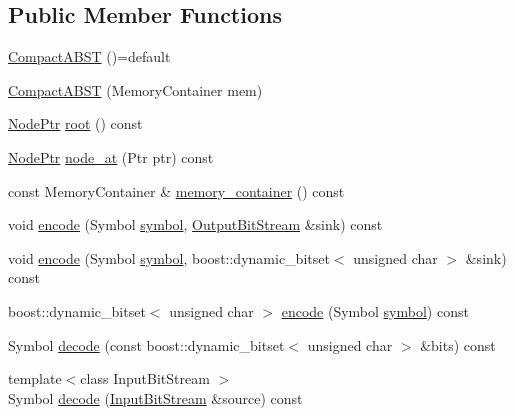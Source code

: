 \subsection*{Public Member Functions}
\begin{DoxyCompactItemize}
\item 
\mbox{\hyperlink{classirkit_1_1io_1_1CompactABST_a1798488f66866fcf6f4d7fd06f86f3e1}{Compact\+A\+B\+ST}} ()=default
\item 
\mbox{\hyperlink{classirkit_1_1io_1_1CompactABST_ae247cd36f3a912208312a6fd20a9deda}{Compact\+A\+B\+ST}} (Memory\+Container mem)
\item 
\mbox{\hyperlink{structirkit_1_1io_1_1CompactABST_1_1NodePtr}{Node\+Ptr}} \mbox{\hyperlink{classirkit_1_1io_1_1CompactABST_a08d1b23d44415a0505e8abf5c723a16a}{root}} () const
\item 
\mbox{\hyperlink{structirkit_1_1io_1_1CompactABST_1_1NodePtr}{Node\+Ptr}} \mbox{\hyperlink{classirkit_1_1io_1_1CompactABST_a6ef6afae469190875c8f49a37fa484e9}{node\+\_\+at}} (Ptr ptr) const
\item 
const Memory\+Container \& \mbox{\hyperlink{classirkit_1_1io_1_1CompactABST_a6c0944a0683df43e03f6faec67d3d719}{memory\+\_\+container}} () const
\item 
void \mbox{\hyperlink{classirkit_1_1io_1_1CompactABST_aa4d1008e712a1fb8e95baa924cc70e50}{encode}} (Symbol \mbox{\hyperlink{porter2_8hpp_a04438e24473719aaf288c57833717164}{symbol}}, \mbox{\hyperlink{classirkit_1_1io_1_1OutputBitStream}{Output\+Bit\+Stream}} \&sink) const
\item 
void \mbox{\hyperlink{classirkit_1_1io_1_1CompactABST_a204d3d71ef1f0816570b2a2b705b268a}{encode}} (Symbol \mbox{\hyperlink{porter2_8hpp_a04438e24473719aaf288c57833717164}{symbol}}, boost\+::dynamic\+\_\+bitset$<$ unsigned char $>$ \&sink) const
\item 
boost\+::dynamic\+\_\+bitset$<$ unsigned char $>$ \mbox{\hyperlink{classirkit_1_1io_1_1CompactABST_ab959f87690a55266eb838102ba93665b}{encode}} (Symbol \mbox{\hyperlink{porter2_8hpp_a04438e24473719aaf288c57833717164}{symbol}}) const
\item 
Symbol \mbox{\hyperlink{classirkit_1_1io_1_1CompactABST_a5f4fa49fc2cde124bb4f9a4017bd370c}{decode}} (const boost\+::dynamic\+\_\+bitset$<$ unsigned char $>$ \&bits) const
\item 
{\footnotesize template$<$class Input\+Bit\+Stream $>$ }\\Symbol \mbox{\hyperlink{classirkit_1_1io_1_1CompactABST_a30472a27b6d73f6c567533bdb0a747a5}{decode}} (\mbox{\hyperlink{classirkit_1_1io_1_1InputBitStream}{Input\+Bit\+Stream}} \&source) const
\end{DoxyCompactItemize}
